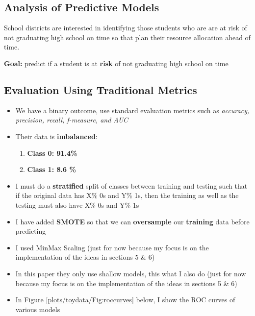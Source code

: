 \documentclass{article}
\begin{document}
\subsection{Analysis of Predictive Models}
School districts are interested in identifying those students who are are at risk of not graduating high school on time so that plan their resource allocation ahead of time.

\noindent \textbf{Goal:} predict if a student is at \textbf{risk} of not graduating high school on time

\subsection{Evaluation Using Traditional Metrics}
\begin{itemize}
\item We have a binary outcome, use standard evaluation metrics such as \textit{accuracy, precision, recall, f-measure, and AUC}
\item Their data is \textbf{imbalanced}:
\begin{enumerate}
\item \textbf{Class 0: 91.4\%}
\item \textbf{Class 1: 8.6 \%}
\end{enumerate}

\item I must do a \textbf{stratified} split of classes between training and testing such that if the original data has X\% 0s and Y\% 1s, then the training as well as the testing must also have X\% 0s and Y\%  1s

\item I have added \textbf{SMOTE} so that we can \textbf{oversample} our \textbf{training} data before predicting

\item I used MinMax Scaling (just for now because my focus is on the implementation of the ideas in sections 5 \& 6)

\item In this paper they only use shallow models, this what I also do (just for now because my focus is on the implementation of the ideas in sections 5 \& 6)

\item In Figure \ref{plots/toydata/Fig:roccurves} below, I show the ROC curves of various models
\end{itemize}
\end{document}
